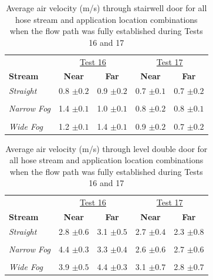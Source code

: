 \documentclass[12pt,oneside]{book}
\begin{document}
\begin{table}[!ht]
\caption{Average air velocity (m/s) through stairwell door for all hose stream and application location combinations when the flow path was fully established during Tests 16 and 17}
\begin{tabular}{lcccc}
\toprule
 & \multicolumn{2}{c}{\underline{Test 16}} & \multicolumn{2}{c}{\underline{Test 17}}
\\
\textbf{Stream} & \textbf{Near} & \textbf{Far} & \textbf{Near} & \textbf{Far} \\
\midrule
\textit{Straight} & 
0.8 $\pm 0.2$ & 0.9 $\pm 0.2$ & 
0.7 $\pm 0.1$ & 0.7 $\pm 0.2$
\\	\multicolumn{5}{c}{}	\\
\textit{Narrow Fog} & 
1.4 $\pm 0.1$ & 1.0 $\pm 0.1$ & 
0.8 $\pm 0.2$ & 0.8 $\pm 0.1 $          
\\	\multicolumn{5}{c}{}	\\
\textit{Wide Fog} 	& 
1.2 $\pm 0.1$ & 1.4 $\pm 0.1$ & 
0.9 $\pm 0.2$ & 0.7 $\pm 0.2$
\\
\bottomrule
\end{tabular}
\label{table:Tests_16_17_BDP_A10_Avgs}
\end{table}

\begin{table}[!ht]
\caption{Average air velocity (m/s) through  level double door for all hose stream and application location combinations when the flow path was fully established during Tests 16 and 17}
\begin{tabular}{lcccc}
\toprule
 & \multicolumn{2}{c}{\underline{Test 16}} & \multicolumn{2}{c}{\underline{Test 17}}
\\
\textbf{Stream} & \textbf{Near} & \textbf{Far} & \textbf{Near} & \textbf{Far} \\
\midrule
\textit{Straight} & 
2.8 $\pm 0.6$ & 3.1 $\pm 0.5$ & 
2.7 $\pm 0.4$ & 2.3 $\pm 0.8$
\\	\multicolumn{5}{c}{}	\\
\textit{Narrow Fog} & 
4.4 $\pm 0.3$ & 3.3 $\pm 0.4$ & 
2.6 $\pm 0.6$ & 2.7 $\pm 0.6$
\\	\multicolumn{5}{c}{}	\\
\textit{Wide Fog} 	& 
3.9 $\pm 0.5$ & 4.4 $\pm 0.3$ & 
3.1 $\pm 0.7$ & 2.8 $\pm 0.7$ 
\\ 
\bottomrule
\end{tabular}
\label{table:Tests_16_17_BDP_A13_Avgs}
\end{table}
\end{document}

